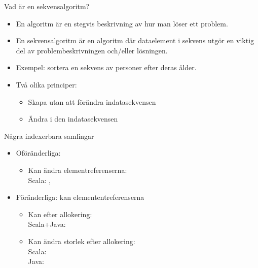 

\begin{Slide}{Vad är en sekvensalgoritm?}
\begin{itemize} 
\item En algoritm är en stegvis beskrivning av hur man löser ett problem. 
\item En sekvensalgoritm är en algoritm där dataelement i sekvens utgör en viktig del av problembeskrivningen och/eller lösningen.   

\item Exempel: sortera en sekvens av personer efter deras ålder.

\item Två olika principer:
\begin{itemize} 
\item Skapa  utan att förändra indatasekvensen
\item Ändra   i den  indatasekvensen
\end{itemize}
\end{itemize}

\end{Slide}


\begin{Slide}{Några indexerbara samlingar}
\begin{itemize}
\item Oföränderliga:  
  \begin{itemize} 
  \item Kan  ändra elementreferenserna: \\ 
    Scala: , 
  \end{itemize}

\item Föränderliga: kan  elemententreferenserna
  \begin{itemize} 
  \item Kan  efter allokering: \\ Scala+Java:  
  \item Kan ändra storlek efter allokering: \\ Scala:  \\ Java: 
  \end{itemize}
\end{itemize}
\end{Slide}

